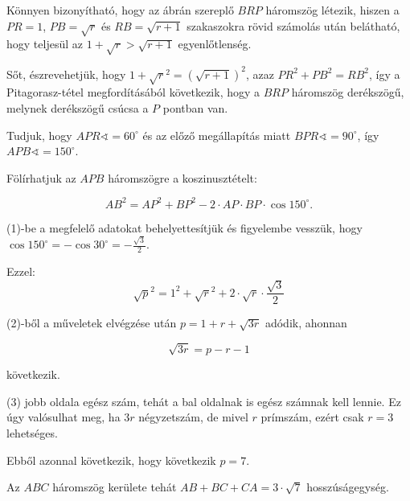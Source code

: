 \documentclass[a4paper,10pt]{article}
\begin{document}
Könnyen bizonyítható, hogy az ábrán szereplő $BRP$ háromszög
létezik, hiszen a $PR = 1$, $PB = \sqrt r$ és $RB = \sqrt{r+1}$ szakaszokra rövid
számolás után belátható, hogy teljesül az $1 +\sqrt r > \sqrt{r+ 1}$ egyenlőtlenség.

Sőt, észrevehetjük, hogy $1+\sqrt r^2 = \left(\sqrt{r+1}\right)^2$, azaz 
$PR^2+PB^2=RB^2$, így a Pitagorasz-tétel megfordításából következik, hogy a $BRP$
háromszög derékszögű, melynek derékszögű csúcsa a $P$ pontban van.

Tudjuk, hogy $APR\sphericalangle = 60^\circ$ és az előző megállapítás miatt
$BPR\sphericalangle = 90^\circ$, így $APB\sphericalangle = 150^\circ$.

Fölírhatjuk az $APB$ háromszögre a koszinusztételt:

\begin{equation}
AB^2 = AP^2+BP^2-2\cdot AP\cdot BP\cdot \cos 150^\circ .
\end{equation}

(1)-be a megfelelő adatokat behelyettesítjük és figyelembe
vesszük, hogy $\cos 150^\circ = -\cos 30^\circ =-\frac{\sqrt 3}{2}$.

Ezzel:
\begin{equation}
\sqrt p^2=1^2+\sqrt r^2+2\cdot \sqrt r\cdot \frac{\sqrt 3}{2}
\end{equation}


(2)-ből a műveletek elvégzése után $p=1+r+\sqrt{3r}$ adódik, ahonnan

\begin{equation}
\sqrt{3r}=p-r-1
\end{equation}

következik.

(3) jobb oldala egész szám, tehát a bal oldalnak is egész számnak
kell lennie. Ez úgy valósulhat meg, ha $3r$ négyzetszám, de mivel $r$
prímszám, ezért csak $r=3$ lehetséges.

Ebből azonnal következik, hogy következik $p=7$. 

Az $ABC$ háromszög kerülete tehát
 $AB + BC + CA = 3\cdot\sqrt{7}$ hosszúságegység.
\end{document}
